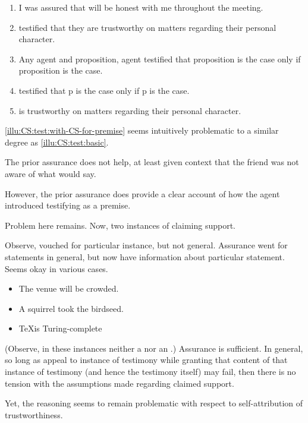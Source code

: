 \begin{note}[Testimony 2]
  \begin{illustration}[Testimony 2]\label{illu:CS:test:with-CS-for-premise}
    \mbox{}
    \begin{enumerate}[label=\arabic*., ref=(\arabic*)]
    \item I was assured that  will be honest with me throughout the meeting.
    \item\label{ex:eiS:tt:test}  testified that they are trustworthy on matters regarding their personal character.
    \item Any agent and proposition, agent testified that proposition is the case only if proposition is the case.
    \item {} testified that p is the case only if p is the case.
    \item\label{ex:eiS:tt:ok}  is trustworthy on matters regarding their personal character.
    \end{enumerate}
  \end{illustration}

  \autoref{illu:CS:test:with-CS-for-premise} seems intuitively problematic to a similar degree as \ref{illu:CS:test:basic}.

  The prior assurance does not help, at least given context that the friend was not aware of what  would say.

  However, the prior assurance does provide a clear account of how the agent introduced  testifying as a premise.
\end{note}

\begin{note}
  Problem here remains.
  Now, two instances of claiming support.

  Observe, vouched for particular instance, but not general.
  Assurance went for statements in general, but now have information about particular statement.
  Seems okay in various cases.

  \begin{itemize}
  \item The venue will be crowded.
  \item A squirrel took the birdseed.
  \item \TeX is Turing-complete
  \end{itemize}
  (Observe, in these instances neither a \requ{} nor an \expec{}.)
  Assurance is sufficient.
  In general, so long as appeal to instance of testimony while granting that content of that instance of testimony (and hence the testimony itself) may fail, then there is no tension with the assumptions made regarding claimed support.

  Yet, the reasoning seems to remain problematic with respect to self-attribution of trustworthiness.
\end{note}

